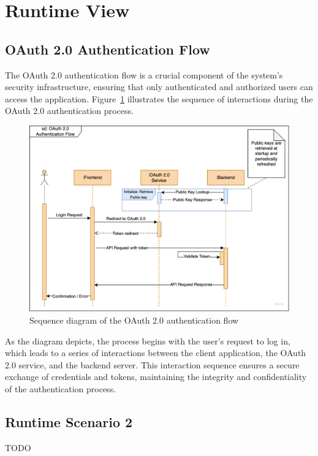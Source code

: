 \section{Runtime View}\label{sec:runtime-view}

\subsection{OAuth 2.0 Authentication Flow}\label{subsec:oauth-2.0-authentication-flow}

The OAuth 2.0 authentication flow is a crucial component of the system's security infrastructure, ensuring that only authenticated and authorized users can access the application.
Figure~\ref{fig:oauth_sequence} illustrates the sequence of interactions during the OAuth 2.0 authentication process.

\begin{figure}[ht]
    \centering
    \includegraphics[scale=0.16]{images/high_level_architecture/authentication_flow}
    \caption{Sequence diagram of the OAuth 2.0 authentication flow}
    \label{fig:oauth_sequence}
\end{figure}

As the diagram depicts, the process begins with the user's request to log in, which leads to a series of interactions between the client application, the OAuth 2.0 service, and the backend server. This interaction sequence ensures a secure exchange of credentials and tokens, maintaining the integrity and confidentiality of the authentication process.

\subsection{Runtime Scenario 2}\label{subsec:runtime-scenario-2}
TODO